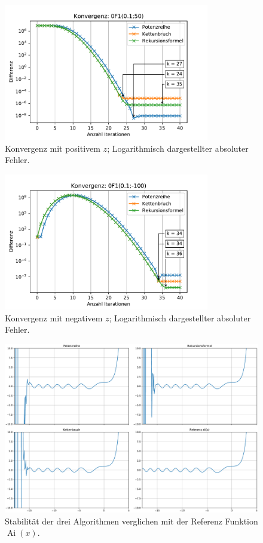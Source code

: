 \begin{figure}
    \centering
    \includegraphics[width=0.8\textwidth]{papers/0f1/images/konvergenzPositiv.pdf}
    \caption{Konvergenz mit positivem $z$; Logarithmisch dargestellter absoluter Fehler.
    \label{0f1:ausblick:plot:konvergenz:positiv}}
\end{figure}

\begin{figure}
    \centering
    \includegraphics[width=0.8\textwidth]{papers/0f1/images/konvergenzNegativ.pdf}
    \caption{Konvergenz mit negativem $z$; Logarithmisch dargestellter absoluter Fehler.
    \label{0f1:ausblick:plot:konvergenz:negativ}}
\end{figure}

\begin{figure}
    \centering
    \includegraphics[width=1\textwidth]{papers/0f1/images/stabilitaet.pdf}
    \caption{Stabilität der drei Algorithmen verglichen mit der Referenz Funktion $\operatorname{Ai}(x)$.
    \label{0f1:ausblick:plot:airy:stabilitaet}}
\end{figure}

